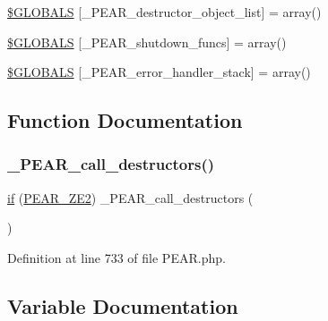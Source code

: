 \begin{DoxyCompactItemize}
\item 
\hyperlink{PEAR_8php_aa6e035215f421c936187dc93245dfa9c}{\$\+G\+L\+O\+B\+A\+LS} \mbox{[}\textquotesingle{}\+\_\+\+P\+E\+A\+R\+\_\+destructor\+\_\+object\+\_\+list\textquotesingle{}\mbox{]} = array()
\item 
\hyperlink{PEAR_8php_a1b8ec5f9024c084cb421fac6fa26a722}{\$\+G\+L\+O\+B\+A\+LS} \mbox{[}\textquotesingle{}\+\_\+\+P\+E\+A\+R\+\_\+shutdown\+\_\+funcs\textquotesingle{}\mbox{]} = array()
\item 
\hyperlink{PEAR_8php_a9fbcc5d2c4987f48d54d4c3723a8c5d6}{\$\+G\+L\+O\+B\+A\+LS} \mbox{[}\textquotesingle{}\+\_\+\+P\+E\+A\+R\+\_\+error\+\_\+handler\+\_\+stack\textquotesingle{}\mbox{]} = array()
\end{DoxyCompactItemize}


\subsection{Function Documentation}
\mbox{\label{PEAR_8php_af9e3621e2aa4f0546c04ab675e5efca6}} 
\subsubsection{\texorpdfstring{\+\_\+\+P\+E\+A\+R\+\_\+call\+\_\+destructors()}{\_PEAR\_call\_destructors()}}
{\footnotesize\ttfamily \hyperlink{config_8inc_8php_a73b98c0274e28635a594091f9ca43cb4}{if} (\hyperlink{PEAR_8php_a16b6fef5a6547779f3d9d6e1b7c5c2b5}{P\+E\+A\+R\+\_\+\+Z\+E2}) \+\_\+\+P\+E\+A\+R\+\_\+call\+\_\+destructors (\begin{DoxyParamCaption}{ }\end{DoxyParamCaption})}



Definition at line 733 of file P\+E\+A\+R.\+php.



\subsection{Variable Documentation}
\mbox{\label{PEAR_8php_afebfe34c0ac29a64ce790889963af69a}} 
